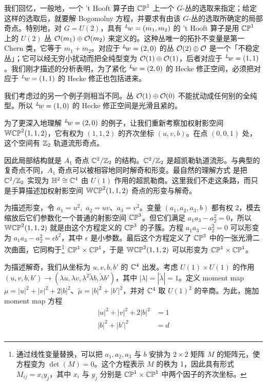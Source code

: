 我们回忆，一般地，一个 't Hooft 算子由 $\Bbb{CP}^1$ 上一个 $G$-丛的选取来指定；给定这样的选取后，就要解 Bogomolny 方程，并要求有由该 $G$-丛的选取所确定的局部奇点。特别地，对 $G=U(2)$，具有 $^L\negthinspace w=(m_1,m_2)$ 的 't Hooft 算子是用 $\Bbb{CP}^1$ 上的 $U(2)$ 丛 ${\cal O}(m_1)\oplus {\cal O}(m_2)$ 来定义的。这种丛唯一的拓扑不变量是第一 Chern 类，它等于 $m_1+m_2$。对应于 $^L\negthinspace w=(2,0)$ 的丛 ${\cal O}(2)\oplus {\cal O}$ 是一个「不稳定丛」；它可以经无穷小扰动而把全纯型变为 ${\cal O}(1)\oplus {\cal O}(1)$，后者对应于 $^L\negthinspace w =(1,1)$。我们刚才描述的分析表明，为了紧化 $^L\negthinspace w=(2,0)$ 的 Hecke 修正空间，必须把对应于 $^L\negthinspace w=(1,1)$ 的 Hecke 修正也包括进来。

我们考虑过的另一个例子则相当不同。丛 ${\cal O}(1)\oplus {\cal O}(0)$ 不能扰动成任何别的全纯型。所以 $^L\negthinspace w=(1,0)$ 的 Hecke 修正空间是光滑且紧的。

\par{}

为了更深入地理解 $^L\negthinspace w=(2,0)$ 的例子，让我们重新考察加权射影空间 $\Bbb{WCP}^2(1,1,2)$，它有权为 $(1,1,2)$ 的齐次坐标 $(u,v,b)$。在点 $(0,0,1)$ 处，这个空间有 $\Bbb{Z}_2$ 轨道流形奇点。

因此局部结构就是 $A_1$ 奇点 $\Bbb{C}^2/\Bbb{Z}_2$ 的结构。$\Bbb{C}^2/\Bbb{Z}_2$ 是超凯勒轨道流形。与典型的复奇点不同，$A_1$ 奇点可以被相容地同时解奇和形变。最自然的理解方式 \cite{ref121} 是把 $\Bbb{C}^2/\Bbb{Z}_2$ 实现为 $\Bbb{H}^2\cong \Bbb{C}^4$ 由 $U(1)$ 作用的超凯勒商。这里我们不走这条路，而只是手算描述加权射影空间 $\Bbb{WCP}^{2}(1,1,2)$ 奇点的形变与解奇。

为描述形变，令 $a_1=u^2,$ $a_2=uv$、$a_3=v^2$。变量 $(a_1,a_2,a_3,b)$ 都有权 2，模去缩放后它们参数化一个普通的射影空间 $\Bbb{CP}^3$。但它们满足 $a_1a_3-a_2^2=0$，所以 $\Bbb{WCP}^2(1,1,2)$ 就是由这个方程定义的 $\Bbb{CP}^3$ 的子簇。方程 $a_1a_3-a_2^2=0$ 可以形变为 $a_1a_3-a_2^2=\epsilon b^2$，其中 $\epsilon$ 是小参数。最后这个方程定义了 $\Bbb{CP}^3$ 中的一张光滑二次曲面，它同构于\footnote{通过线性变量替换，可以把 $a_1,a_2,a_3$ 与 $b$ 安排为 $2\times 2$ 矩阵 $M$ 的矩阵元，使方程变为 $\det(M)=0$。这个方程表示 $M$ 的秩为 1，因此具有形式 $M_{ij}=x_iy_j$，其中 $x_i$ 与 $y_j$ 分别是 $\Bbb{CP}^1\times \Bbb{CP}^1$ 中两个因子的齐次坐标。} $\Bbb{CP}^1\times \Bbb{CP}^1$，于是 $\Bbb{WCP}^2(1,1,2)$ 可以形变为 $\Bbb{CP}^1\times \Bbb{CP}^1$。

为描述解奇，我们从坐标为 $u,v,b,b'$ 的 $\Bbb{C}^4$ 出发。考虑 $U(1)\times U(1)$ 的作用 $(u,v,b,b')\to (\lambda u,\lambda v,\lambda^2 \tilde \lambda b,\tilde\lambda b')$，其中 $|\lambda|=|\tilde\lambda|=1$。定义 moment map $\mu=|u|^2+|v|^2+2|b|^2$、$\tilde\mu= |b|^2+|b'|^2$，并对 $\Bbb{C}^4$ 取 $U(1)^2$ 的辛商。为此，施加 moment map 方程
\setcounter{equation}{21}
\begin{equation}\label{eq:ripo}
\begin{aligned}|u|^2+|v|^2+2|b|^2 & = 1\\
                                        |b|^2+|b'|^2& = d\\\end{aligned}
\end{equation}

